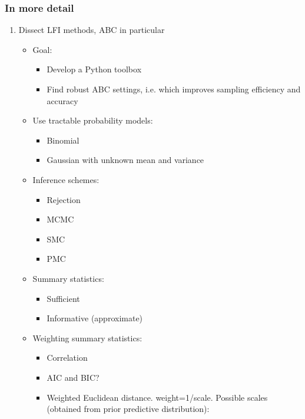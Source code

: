 \subsubsection{In more detail} 

\begin{enumerate}
    \item Dissect LFI methods, ABC in particular
    \begin{itemize}
        \item Goal:
        \begin{itemize}
            \item Develop a Python toolbox 
            \item Find robust ABC settings, i.e. which improves sampling efficiency and accuracy
        \end{itemize}
        \item Use tractable probability models:
        \begin{itemize}
            \item Binomial 
            \item Gaussian with unknown mean and variance 
        \end{itemize}
        \item Inference schemes:
        \begin{itemize}
            \item Rejection 
            \item MCMC
            \item SMC 
            \item PMC
        \end{itemize}
        \item Summary statistics:  
        \begin{itemize}
            \item Sufficient
            \item Informative (approximate)
        \end{itemize}
        \item Weighting summary statistics:
        \begin{itemize}
            \item Correlation
            \item AIC and BIC? 
            \item Weighted Euclidean distance. weight=1/scale. Possible scales (obtained from prior predictive distribution):

\end{itemize}
\end{itemize}
\end{enumerate}
